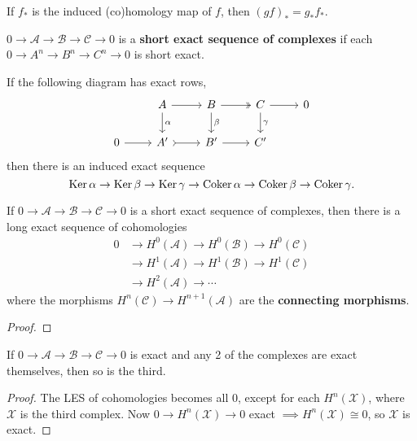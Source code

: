 \documentclass[twoside,10pt]{report}
\begin{document}
\begin{prop}
	If $f_{*}$ is the induced (co)homology map of $f$, then $(gf)_{*}=g_{*}f_{*}$.
\end{prop}

\begin{defn}[]
$0\to \mathcal{A}\to \mathcal{B}\to \mathcal{C}\to 0$ is a \textbf{short exact sequence of complexes} if each $0\to A^{n}\to B^{n}\to C^{n}\to 0$ is short exact.
\end{defn}

\newpage

\begin{lem}
	If the following diagram has exact rows,
	\[
	\begin{tikzcd}
		& A \rar\dar{\alpha} & B \rar[two heads]\dar{\beta} & C \rar\dar{\gamma} & 0 \\
		0 \rar & A' \rar[tail] & B' \rar & C'
	\end{tikzcd}
	\] 
	then there is an induced exact sequence
	\[
		\operatorname{Ker} \alpha \to \operatorname{Ker} \beta \to \operatorname{Ker} \gamma \to \operatorname{Coker} \alpha \to \operatorname{Coker} \beta \to \operatorname{Coker} \gamma.
	\] 
\end{lem}

\begin{thrm}
If $0\to \mathcal{A}\to \mathcal{B}\to \mathcal{C}\to 0$ is a short exact sequence of complexes, then there is a long exact sequence of cohomologies
\begin{align*}
	0 &\to H^{0}(\mathcal{A})\to H^{0}(\mathcal{B})\to H^{0}(\mathcal{C}) \\
	  &\to H^{1}(\mathcal{A})\to H^{1}(\mathcal{B})\to H^{1}(\mathcal{C}) \\
	  &\to H^{2}(\mathcal{A})\to \cdots
\end{align*}
where the morphisms $H^{n}(\mathcal{C})\to H^{n+1}(\mathcal{A})$ are the \textbf{connecting morphisms}.
\end{thrm}
\begin{proof}
\end{proof}

\begin{cor}
If $0\to \mathcal{A}\to \mathcal{B}\to \mathcal{C}\to 0$ is exact and any 2 of the complexes are exact themselves, then so is the third.
\end{cor}
\begin{proof}
	The LES of cohomologies becomes all 0, except for each $H^{n}(\mathcal{X})$, where $\mathcal{X}$ is the third complex. Now $0\to H^{n}(\mathcal{X})\to 0$ exact $\implies H^{n}(\mathcal{X}) \cong 0$, so $\mathcal{X}$ is exact.
\end{proof}
\end{document}
